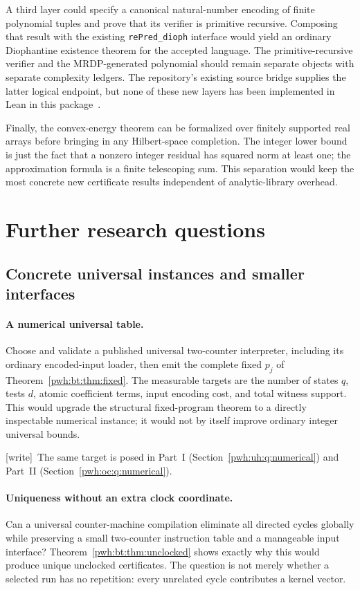 \documentclass[11pt,letterpaper]{article}
\numberwithin{equation}{section}
\theoremstyle{definition}
\newcommand{\wtag}{\textup{[write]}}
\begin{document}
A third layer could specify a canonical natural-number encoding of
finite polynomial tuples and prove that its verifier is primitive
recursive. Composing that result with the existing
\texttt{rePred\_dioph} interface would yield an ordinary Diophantine
existence theorem for the accepted language. The primitive-recursive
verifier and the MRDP-generated polynomial should remain separate
objects with separate complexity ledgers. The repository's existing
source bridge supplies the latter logical endpoint, but none of these
new layers has been implemented in Lean in this package~\cite{bt:repo-bridge}.

Finally, the convex-energy theorem can be formalized over finitely
supported real arrays before bringing in any Hilbert-space completion.
The integer lower bound is just the fact that a nonzero integer residual
has squared norm at least one; the approximation formula is a finite
telescoping sum. This separation would keep the most concrete new
certificate results independent of analytic-library overhead.

\section{Further research questions}\label{pwh:bt:sec:future}

\subsection{Concrete universal instances and smaller interfaces}\label{pwh:bt:q:concrete}
\paragraph{A numerical universal table.}
Choose and validate a published universal two-counter interpreter,
including its ordinary encoded-input loader, then emit the complete
fixed $p_j$ of Theorem~\ref{pwh:bt:thm:fixed}. The measurable targets are the
number of states $q$, tests $d$, atomic coefficient terms, input encoding
cost, and total witness support. This would upgrade the structural
fixed-program theorem to a directly inspectable numerical instance;
it would not by itself improve ordinary integer universal bounds.

\wtag\ The same target is posed in Part~I (Section~\ref{pwh:uh:q:numerical})
and Part~II (Section~\ref{pwh:oc:q:numerical}).

\paragraph{Uniqueness without an extra clock coordinate.}
Can a universal counter-machine compilation eliminate all directed
cycles globally while preserving a small two-counter instruction table
and a manageable input interface? Theorem~\ref{pwh:bt:thm:unclocked} shows
exactly why this would produce unique unclocked certificates. The
question is not merely whether a selected run has no repetition: every
unrelated cycle contributes a kernel vector.
\end{document}
